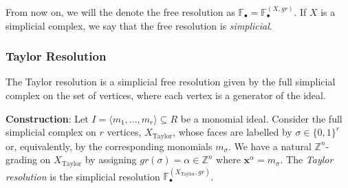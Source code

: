 \documentclass[paper=a4, fontsize=11pt]{scrartcl} %
\theoremstyle{plain}
\theoremstyle{definition}
\begin{document}
From now on, we will the denote the free resolution as $\mathbb{F}_{\bullet} = \mathbb{F}_{\bullet}^{(X,gr)}$. If $X$ is a simplicial complex, we say that the free resolution is \textit{simplicial}.
\subsubsection{Taylor Resolution}

The Taylor resolution is a simplicial free resolution given by the full simplicial complex on the set of vertices, where each vertex is a generator of the ideal.

\textbf{Construction}: Let $I = \langle m_1, \dots, m_r \rangle \subseteq R$ be a monomial ideal. Consider the full simplicial complex on $r$ vertices, $X_{\text{Taylor}}$, whose faces are labelled by $\sigma \in \lbrace 0,1 \rbrace^r$ or, equivalently, by the corresponding monomials $m_{\sigma}$. We have a natural $\mathbb{Z}^n$-grading on $X_{\text{Taylor}}$ by assigning $gr(\sigma) = \alpha \in \mathbb{Z}^n$ where $\mathbf{x}^{\alpha} = m_{\sigma}$. The \textit{Taylor resolution} is the simplicial resolution $\mathbb{F}_{\bullet}^{(X_{\text{Taylor}},gr)}$.
\end{document}
